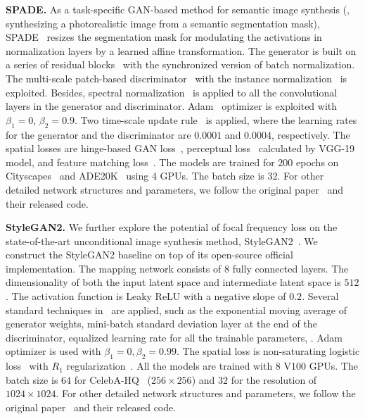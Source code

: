 \documentclass[10pt,twocolumn,letterpaper]{article}
\begin{document}
\vspace{0.05cm}
\noindent
\textbf{SPADE.}
As a task-specific GAN-based method for semantic image synthesis (\ie, synthesizing a photorealistic image from a semantic segmentation mask), SPADE~\cite{SPADE} resizes the segmentation mask for modulating the activations in normalization layers by a learned affine transformation.
The generator is built on a series of residual blocks~\cite{resnet} with the synchronized version of batch normalization. The multi-scale patch-based discriminator~\cite{pix2pixhd} with the instance normalization~\cite{IN} is exploited. Besides, spectral normalization~\cite{spectralnorm} is applied to all the convolutional layers in the generator and discriminator.
Adam~\cite{adam} optimizer is exploited with $\beta_1=0$, $\beta_2=0.9$. Two time-scale update rule~\cite{TTUR} is applied, where the learning rates for the generator and the discriminator are $0.0001$ and $0.0004$, respectively.
The spatial losses are hinge-based GAN loss~\cite{geometricgan,spectralnorm,selfattentiongan}, perceptual loss~\cite{perceptualloss} calculated by VGG-19~\cite{vgg} model, and feature matching loss~\cite{pix2pixhd}.
The models are trained for $200$ epochs on Cityscapes~\cite{cityscapes} and ADE20K~\cite{ade20k} using $4$ GPUs. The batch size is $32$.
For other detailed network structures and parameters, we follow the original paper~\cite{SPADE} and their released code.


\vspace{0.05cm}
\noindent
\textbf{StyleGAN2.}
We further explore the potential of focal frequency loss on the state-of-the-art unconditional image synthesis method, StyleGAN2~\cite{stylegan2}.
We construct the StyleGAN2 baseline on top of its open-source official implementation.
The mapping network consists of $8$ fully connected layers. The dimensionality of both the input latent space and intermediate latent space is $512$.
The activation function is Leaky ReLU with a negative slope of $0.2$.
Several standard techniques in~\cite{pggan,stylegan} are applied, such as the exponential moving average of generator weights, mini-batch standard deviation layer at the end of the discriminator, equalized learning rate for all the trainable parameters, \etc.
Adam~\cite{adam} optimizer is used with $\beta_1=0, \beta_2=0.99$.
The spatial loss is non-saturating logistic loss~\cite{GAN,stylegan2} with $R_1$ regularization~\cite{ganstability}.
All the models are trained with $8$ V100 GPUs. The batch size is $64$ for CelebA-HQ~\cite{pggan} ($256 \times 256$) and $32$ for the resolution of $1024 \times 1024$.
For other detailed network structures and parameters, we follow the original paper~\cite{stylegan2} and their released code.
\end{document}
